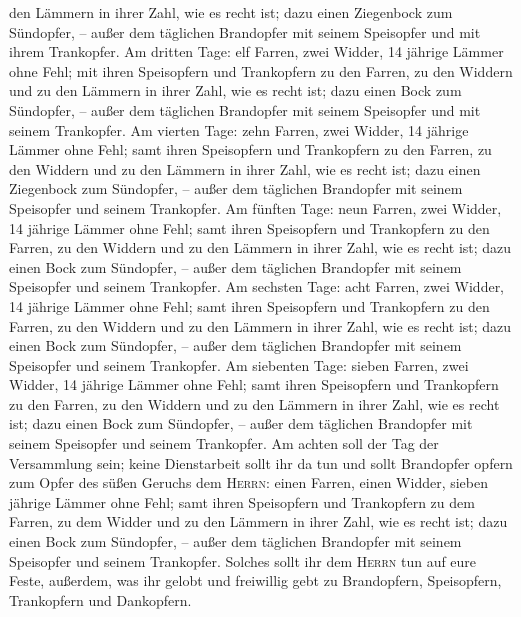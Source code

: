 den Lämmern in ihrer Zahl, wie es recht ist;  dazu einen
Ziegenbock zum Sündopfer, -- außer dem täglichen Brandopfer mit seinem
Speisopfer und mit ihrem Trankopfer.  Am dritten Tage:
elf Farren, zwei Widder, 14 jährige Lämmer ohne Fehl; 
mit ihren Speisopfern und Trankopfern zu den Farren, zu den Widdern und
zu den Lämmern in ihrer Zahl, wie es recht ist;  dazu
einen Bock zum Sündopfer, -- außer dem täglichen Brandopfer mit seinem
Speisopfer und mit seinem Trankopfer.  Am vierten Tage:
zehn Farren, zwei Widder, 14 jährige Lämmer ohne Fehl; 
samt ihren Speisopfern und Trankopfern zu den Farren, zu den Widdern und
zu den Lämmern in ihrer Zahl, wie es recht ist;  dazu
einen Ziegenbock zum Sündopfer, -- außer dem täglichen Brandopfer mit
seinem Speisopfer und seinem Trankopfer.  Am fünften
Tage: neun Farren, zwei Widder, 14 jährige Lämmer ohne Fehl;
 samt ihren Speisopfern und Trankopfern zu den Farren, zu
den Widdern und zu den Lämmern in ihrer Zahl, wie es recht ist;
 dazu einen Bock zum Sündopfer, -- außer dem täglichen
Brandopfer mit seinem Speisopfer und seinem Trankopfer. 
Am sechsten Tage: acht Farren, zwei Widder, 14 jährige Lämmer ohne Fehl;
 samt ihren Speisopfern und Trankopfern zu den Farren, zu
den Widdern und zu den Lämmern in ihrer Zahl, wie es recht ist;
 dazu einen Bock zum Sündopfer, -- außer dem täglichen
Brandopfer mit seinem Speisopfer und seinem Trankopfer. 
Am siebenten Tage: sieben Farren, zwei Widder, 14 jährige Lämmer ohne
Fehl;  samt ihren Speisopfern und Trankopfern zu den
Farren, zu den Widdern und zu den Lämmern in ihrer Zahl, wie es recht
ist;  dazu einen Bock zum Sündopfer, -- außer dem
täglichen Brandopfer mit seinem Speisopfer und seinem Trankopfer.
 Am achten soll der Tag der Versammlung sein; keine
Dienstarbeit sollt ihr da tun  und sollt Brandopfer
opfern zum Opfer des süßen Geruchs dem \textsc{Herrn}: einen Farren,
einen Widder, sieben jährige Lämmer ohne Fehl;  samt
ihren Speisopfern und Trankopfern zu dem Farren, zu dem Widder und zu
den Lämmern in ihrer Zahl, wie es recht ist;  dazu einen
Bock zum Sündopfer, -- außer dem täglichen Brandopfer mit seinem
Speisopfer und seinem Trankopfer.  Solches sollt ihr dem
\textsc{Herrn} tun auf eure Feste, außerdem, was ihr gelobt und
freiwillig gebt zu Brandopfern, Speisopfern, Trankopfern und Dankopfern.
